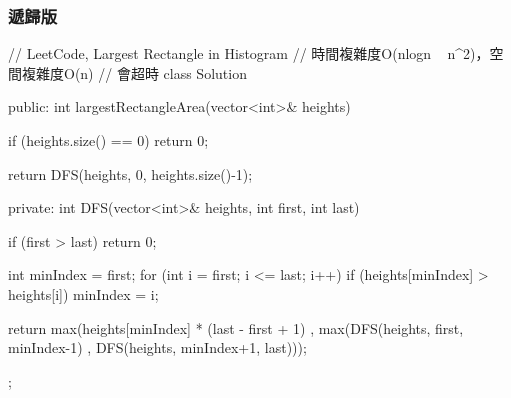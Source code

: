 \subsubsection{遞歸版}
\begin{Code}
// LeetCode, Largest Rectangle in Histogram
// 時間複雜度O(nlogn ~ n^2)，空間複雜度O(n)
// 會超時
class Solution {
public:
    int largestRectangleArea(vector<int>& heights) {
        if (heights.size() == 0) return 0;

        return DFS(heights, 0, heights.size()-1);
    }
private:
    int DFS(vector<int>& heights, int first, int last) {
        if (first > last) return 0;

        int minIndex = first;
        for (int i = first; i <= last; i++) {
            if (heights[minIndex] > heights[i])
                minIndex = i;
        }

        return max(heights[minIndex] * (last - first + 1)
                   , max(DFS(heights, first, minIndex-1)
                         , DFS(heights, minIndex+1, last)));
    }
};
\end{Code}

